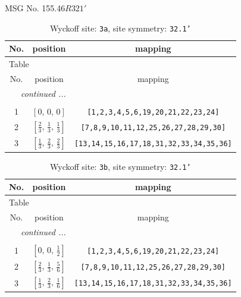 \documentclass[fleqn,8pt]{jsarticle}
\begin{document}
\setcounter{MaxMatrixCols}{32}

\renewcommand{\tablename}{Table~}
\renewcommand{\figurename}{Figure~}
\begin{center}
\LARGE
MSG No. 155.46\quad$R321'$
\end{center}
\renewcommand{\arraystretch}{1.2}
\begin{longtable}{ccc}
\caption{Wyckoff site: {\tt 3a}, site symmetry: {\tt 32.1'}}
 \\
 \hline \hline
No. & position & mapping \\ \hline \endfirsthead

\multicolumn{2}{l}{\tablename\ \thetable{}} \\
 \hline \hline
No. & position & mapping \\ \hline \endhead

 \hline \hline
\multicolumn{2}{r}{\footnotesize\it continued ...} \\ \endfoot

 \hline \hline
\multicolumn{2}{r}{} \\ \endlastfoot

1 & $\left[ 0,\, 0,\, 0 \right]$ & {\tt [1,2,3,4,5,6,19,20,21,22,23,24]} \\ \hline
2 & $\left[ \frac{2}{3},\, \frac{1}{3},\, \frac{1}{3} \right]$ & {\tt [7,8,9,10,11,12,25,26,27,28,29,30]} \\ \hline
3 & $\left[ \frac{1}{3},\, \frac{2}{3},\, \frac{2}{3} \right]$ & {\tt [13,14,15,16,17,18,31,32,33,34,35,36]} \\
\end{longtable}
\renewcommand{\arraystretch}{1.2}
\begin{longtable}{ccc}
\caption{Wyckoff site: {\tt 3b}, site symmetry: {\tt 32.1'}}
 \\
 \hline \hline
No. & position & mapping \\ \hline \endfirsthead

\multicolumn{2}{l}{\tablename\ \thetable{}} \\
 \hline \hline
No. & position & mapping \\ \hline \endhead

 \hline \hline
\multicolumn{2}{r}{\footnotesize\it continued ...} \\ \endfoot

 \hline \hline
\multicolumn{2}{r}{} \\ \endlastfoot

1 & $\left[ 0,\, 0,\, \frac{1}{2} \right]$ & {\tt [1,2,3,4,5,6,19,20,21,22,23,24]} \\ \hline
2 & $\left[ \frac{2}{3},\, \frac{1}{3},\, \frac{5}{6} \right]$ & {\tt [7,8,9,10,11,12,25,26,27,28,29,30]} \\ \hline
3 & $\left[ \frac{1}{3},\, \frac{2}{3},\, \frac{1}{6} \right]$ & {\tt [13,14,15,16,17,18,31,32,33,34,35,36]} \\
\end{longtable}
\end{document}
